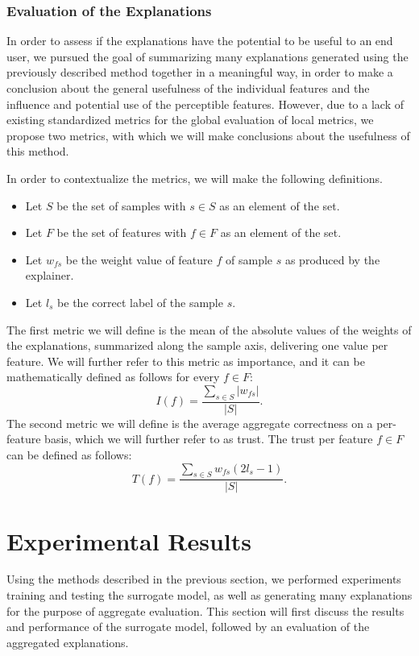 \documentclass{article}
\begin{document}
			\subsubsection{Evaluation of the Explanations}
			In order to assess if the explanations have the potential to be useful to an end
			user, we pursued the goal of summarizing many explanations generated using the
			previously described method together in a meaningful way, in order to make a
			conclusion about the general usefulness of the individual features and the influence
			and potential use of the perceptible features. However, due to a lack of existing
			standardized metrics for the global evaluation of local metrics, we propose two
			metrics, with which we will make conclusions about the usefulness of this method.
			\par
			In order to contextualize the metrics, we will make the following definitions.
			\begin{itemize}
				\item Let \(S\) be the set of samples with \(s \in S\) as an element of the set.
				\item Let \(F\) be the set of features with \(f \in F\) as an element of the set.
				\item Let \(w_{fs}\) be the weight value of feature \(f\) of sample \(s\) as
					produced by the explainer.
				\item Let \(l_{s}\) be the correct label of the sample \(s\).
			\end{itemize}
			The first metric we will define is the mean of the absolute values of the weights of
			the explanations, summarized along the sample axis, delivering one value per feature.
			We will further refer to this metric as importance, and it can be mathematically
			defined as follows for every \(f \in F\):
			\[I(f) = \frac{\sum_{s \in S} |w_{fs}|}{|S|}.\]
			The second metric we will define is the average aggregate correctness on a per-feature
			basis, which we will further refer to as trust. The trust per feature \(f \in F\) can
			be defined as follows:
			\[T(f) = \frac{\sum_{s \in S} w_{fs}(2l_{s}-1)}{|S|}.\]
	\section{Experimental Results}
	\label{sec:experimental_results}
	Using the methods described in the previous section, we performed experiments training and
	testing the surrogate model, as well as generating many explanations for the purpose of
	aggregate evaluation. This section will first discuss the results and performance of the
	surrogate model, followed by an evaluation of the aggregated explanations.
\end{document}
